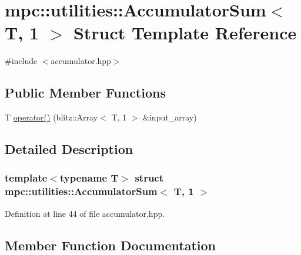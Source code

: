 \hypertarget{structmpc_1_1utilities_1_1_accumulator_sum_3_01_t_00_011_01_4}{}\section{mpc\+:\+:utilities\+:\+:Accumulator\+Sum$<$ T, 1 $>$ Struct Template Reference}
\label{structmpc_1_1utilities_1_1_accumulator_sum_3_01_t_00_011_01_4}


{\ttfamily \#include $<$accumulator.\+hpp$>$}

\subsection*{Public Member Functions}
\begin{DoxyCompactItemize}
\item 
T \mbox{\hyperlink{structmpc_1_1utilities_1_1_accumulator_sum_3_01_t_00_011_01_4_adf9f3d5ba9511c71c44c55a8941ce292}{operator()}} (blitz\+::\+Array$<$ T, 1 $>$ \&input\+\_\+array)
\end{DoxyCompactItemize}


\subsection{Detailed Description}
\subsubsection*{template$<$typename T$>$\newline
struct mpc\+::utilities\+::\+Accumulator\+Sum$<$ T, 1 $>$}



Definition at line 44 of file accumulator.\+hpp.



\subsection{Member Function Documentation}
\mbox{\label{structmpc_1_1utilities_1_1_accumulator_sum_3_01_t_00_011_01_4_adf9f3d5ba9511c71c44c55a8941ce292}} 
